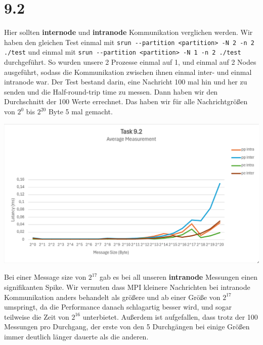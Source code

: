 \documentclass{report}
\begin{document}
\section*{9.2}
Hier sollten \textbf{internode} und \textbf{intranode} Kommunikation verglichen 
werden. Wir haben den gleichen Test einmal mit \newline
\verb|srun --partition <partition> -N 2 -n 2 ./test| \newline
und einmal mit \newline
\verb|srun --partition <partition> -N 1 -n 2 ./test| \newline
durchgeführt. So wurden unsere 2 Prozesse einmal auf 1, und einmal auf 2 Nodes 
ausgeführt, sodass die Kommunikation zwischen ihnen einmal inter- und
einmal intranode war. Der Test bestand darin, eine Nachricht 100 mal hin und 
her zu senden und die Half-round-trip time zu
messen. Dann haben wir den Durchschnitt der 100 Werte errechnet. Das haben wir 
für alle Nachrichtgrößen von \( 2^{0} \) bis \( 2^{20} \) Byte 5 mal gemacht.
\begin{center}
	\includegraphics[width=\textwidth]{Intra-Inter}
\end{center}
Bei einer Message size von \( 2^{17} \) gab es bei all unseren 
\textbf{intranode} Messungen einen signifikanten Spike. Wir vermuten dass MPI 
kleinere Nachrichten
bei intranode Kommunikation anders behandelt als größere und ab einer Größe von 
\( 2^{17} \) umspringt, da die Performance danach schlagartig besser wird, und
sogar teilweise die Zeit von \( 2^{16} \) unterbietet. \newline
Außerdem ist aufgefallen, dass trotz der 100 Messungen pro Durchgang, der erste 
von den 5 Durchgängen bei einige Größen immer deutlich länger
dauerte als die anderen.
\newpage
\end{document}
